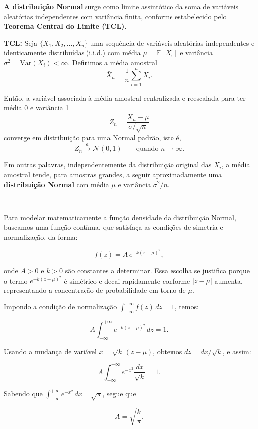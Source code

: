 
\textbf{A distribuição Normal} surge como limite assintótico da soma de variáveis aleatórias independentes 
com variância finita, conforme estabelecido pelo \textbf{Teorema Central do Limite (TCL)}.

\textbf{TCL:} 
Seja $\{X_1, X_2, \ldots, X_n\}$ uma sequência de variáveis aleatórias 
independentes e identicamente distribuídas (i.i.d.) com média $\mu = \mathbb{E}[X_i]$
e variância $\sigma^2 = \mathrm{Var}(X_i) < \infty$.
Definimos a média amostral
\[
\bar{X}_n = \frac{1}{n}\sum_{i=1}^{n} X_i.
\]

Então, a variável associada à média amostral centralizada e reescalada para ter média 0 e variância 1
\[
Z_n = \frac{\bar{X}_n - \mu}{\sigma / \sqrt{n}}
\]
converge em distribuição para uma Normal padrão, isto é,
\[
Z_n \xrightarrow{d} \mathcal{N}(0,1)
\qquad \text{quando } n \to \infty.
\]

Em outras palavras, independentemente da distribuição original das $X_i$, 
a média amostral tende, para amostras grandes, a seguir aproximadamente uma
\textbf{distribuição Normal} com média $\mu$ e variância $\sigma^2 / n$.

---

Para modelar matematicamente a função densidade da distribuição Normal, 
buscamos uma função contínua, que satisfaça as condições de simetria e normalização, da forma:

\[
f(z) = A \, e^{-k(z-\mu)^2},
\]

onde $A>0$ e $k>0$ são constantes a determinar. Essa escolha se justifica porque o termo $e^{-k(z-\mu)^2}$ é simétrico e decai rapidamente conforme $|z-\mu|$ aumenta, representando a concentração de probabilidade em torno de $\mu$.

Impondo a condição de normalização $\int_{-\infty}^{+\infty} f(z)\,dz = 1$, temos:

\[
A \int_{-\infty}^{+\infty} e^{-k(z-\mu)^2}\,dz = 1.
\]

Usando a mudança de variável \(x = \sqrt{k}\,(z-\mu)\), obtemos \(dz = dx/\sqrt{k}\), e assim:

\[
A \int_{-\infty}^{+\infty} e^{-x^2}\frac{dx}{\sqrt{k}} = 1.
\]

Sabendo que \(\displaystyle \int_{-\infty}^{+\infty} e^{-x^2}\,dx = \sqrt{\pi}\), segue que

\[
A = \sqrt{\frac{k}{\pi}}.
\]


